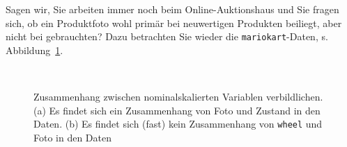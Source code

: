 \documentclass[
  letterpaper,
  twoside,
  open=any]{scrbook}
\theoremstyle{definition}
\theoremstyle{definition}
\theoremstyle{definition}
\theoremstyle{remark}
\begin{document}
Sagen wir, Sie arbeiten immer noch beim Online-Auktionshaus und Sie
fragen sich, ob ein Produktfoto wohl primär bei neuwertigen Produkten
beiliegt, aber nicht bei gebrauchten? Dazu betrachten Sie wieder die
\texttt{mariokart}-Daten, s. Abbildung~\ref{fig-zshg-nom1}.

\begin{figure}

\begin{minipage}{0.45\linewidth}



\end{minipage}%
%
\begin{minipage}{0.10\linewidth}
~\end{minipage}%
%
\begin{minipage}{0.45\linewidth}



\end{minipage}%

\caption{\label{fig-zshg-nom1}Zusammenhang zwischen nominalskalierten
Variablen verbildlichen. (a) Es findet sich ein Zusammenhang von Foto
und Zustand in den Daten. (b) Es findet sich (fast) kein Zusammenhang
von \texttt{wheel} und Foto in den Daten}

\end{figure}%
\end{document}
